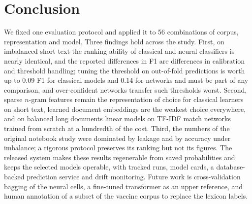 \documentclass[journal,10pt]{IEEEtran}
\begin{document}
\section{Conclusion}
We fixed one evaluation protocol and applied it to 56 combinations of corpus, representation and model. Three findings hold across the study. First, on imbalanced short text the ranking ability of classical and neural classifiers is nearly identical, and the reported differences in F1 are differences in calibration and threshold handling; tuning the threshold on out-of-fold predictions is worth up to 0.09 F1 for classical models and 0.14 for networks and must be part of any comparison, and over-confident networks transfer such thresholds worst. Second, sparse $n$-gram features remain the representation of choice for classical learners on short text, learned document embeddings are the weakest choice everywhere, and on balanced long documents linear models on TF-IDF match networks trained from scratch at a hundredth of the cost. Third, the numbers of the original notebook study were dominated by leakage and by accuracy under imbalance; a rigorous protocol preserves its ranking but not its figures. The released system makes these results regenerable from saved probabilities and keeps the selected models operable, with tracked runs, model cards, a database-backed prediction service and drift monitoring. Future work is cross-validation bagging of the neural cells, a fine-tuned transformer as an upper reference, and human annotation of a subset of the vaccine corpus to replace the lexicon labels.
\end{document}
